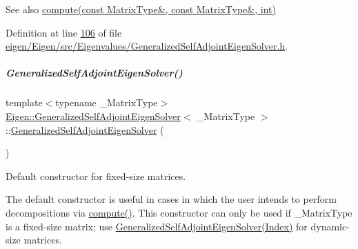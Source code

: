 \begin{DoxySeeAlso}{See also}
\hyperlink{group___eigenvalues___module_a724764fe196612b752042692156ed023}{compute(const Matrix\+Type\&, const Matrix\+Type\&, int)} 
\end{DoxySeeAlso}


Definition at line \hyperlink{eigen_2_eigen_2src_2_eigenvalues_2_generalized_self_adjoint_eigen_solver_8h_source_l00106}{106} of file \hyperlink{eigen_2_eigen_2src_2_eigenvalues_2_generalized_self_adjoint_eigen_solver_8h_source}{eigen/\+Eigen/src/\+Eigenvalues/\+Generalized\+Self\+Adjoint\+Eigen\+Solver.\+h}.

\mbox{\label{group___eigenvalues___module_a501effdbf722c0609ea05ff3fd4cc721}} 
\subparagraph{\texorpdfstring{Generalized\+Self\+Adjoint\+Eigen\+Solver()}{GeneralizedSelfAdjointEigenSolver()}\hspace{0.1cm}{\footnotesize\ttfamily [4/6]}}
{\footnotesize\ttfamily template$<$typename \+\_\+\+Matrix\+Type$>$ \\
\hyperlink{group___eigenvalues___module_class_eigen_1_1_generalized_self_adjoint_eigen_solver}{Eigen\+::\+Generalized\+Self\+Adjoint\+Eigen\+Solver}$<$ \+\_\+\+Matrix\+Type $>$\+::\hyperlink{group___eigenvalues___module_class_eigen_1_1_generalized_self_adjoint_eigen_solver}{Generalized\+Self\+Adjoint\+Eigen\+Solver} (\begin{DoxyParamCaption}{ }\end{DoxyParamCaption})\hspace{0.3cm}{\ttfamily [inline]}}



Default constructor for fixed-\/size matrices. 

The default constructor is useful in cases in which the user intends to perform decompositions via \hyperlink{group___eigenvalues___module_a724764fe196612b752042692156ed023}{compute()}. This constructor can only be used if {\ttfamily \+\_\+\+Matrix\+Type} is a fixed-\/size matrix; use \hyperlink{group___eigenvalues___module_aac849f01a8c6148c645acd10bd3a9b0e}{Generalized\+Self\+Adjoint\+Eigen\+Solver(\+Index)} for dynamic-\/size matrices. 

